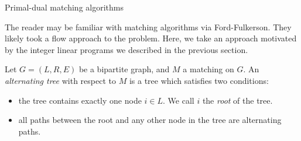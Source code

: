 \documentclass[11pt]{article}
\renewcommand{\'}{^{'}}
\newenvironment{definition}[2][Definition]{\begin{trivlist}
\item[\hskip \labelsep {\bfseries #1}\hskip \labelsep {\bfseries #2.}]}{\end{trivlist}}
\begin{document}
\begin{section}{Primal-dual matching algorithms}

	The reader may be familiar with matching algorithms via Ford-Fulkerson. They likely took a 
	flow approach to the problem. Here, we take an approach motivated by the integer linear 
	programs we described in the previous section. 

	\begin{definition}{(Alternating tree)}
		Let $G = (L,R,E)$ be a bipartite graph, and $M$ a matching on $G$. An 
		\emph{alternating tree} with respect to $M$ is a tree which satisfies two 
		conditions:
		\begin{itemize}
			\item the tree contains exactly one node $i\in L$. We call $i$ the 
				\emph{root} of the tree.
			\item all paths between the root and any other node in the tree are 
				alternating paths.
		\end{itemize}
	\end{definition}
	

\end{section}
\end{document}
